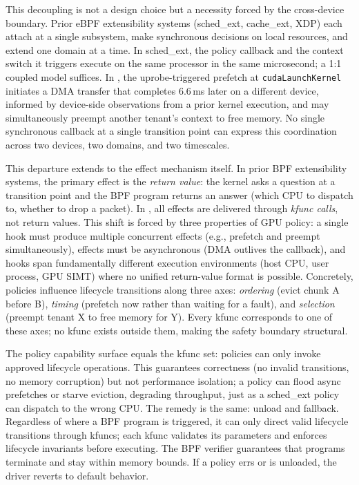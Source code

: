 This decoupling is not a design choice but a necessity forced by the cross-device boundary. Prior eBPF extensibility systems (sched\_ext, cache\_ext, XDP) each attach at a single subsystem, make synchronous decisions on local resources, and extend one domain at a time. In sched\_ext, the policy callback and the context switch it triggers execute on the same processor in the same microsecond; a 1:1 coupled model suffices. In \sys{}, the uprobe-triggered prefetch at \texttt{cudaLaunchKernel} initiates a DMA transfer that completes 6.6\,ms later on a different device, informed by device-side observations from a prior kernel execution, and may simultaneously preempt another tenant's context to free memory. No single synchronous callback at a single transition point can express this coordination across two devices, two domains, and two timescales.

This departure extends to the effect mechanism itself. In prior BPF extensibility systems, the primary effect is the \emph{return value}: the kernel asks a question at a transition point and the BPF program returns an answer (which CPU to dispatch to, whether to drop a packet). In \sys{}, all effects are delivered through \emph{kfunc calls}, not return values. This shift is forced by three properties of GPU policy: a single hook must produce multiple concurrent effects (e.g., prefetch and preempt simultaneously), effects must be asynchronous (DMA outlives the callback), and hooks span fundamentally different execution environments (host CPU, user process, GPU SIMT) where no unified return-value format is possible. Concretely, policies influence lifecycle transitions along three axes: \emph{ordering} (evict chunk A before B), \emph{timing} (prefetch now rather than waiting for a fault), and \emph{selection} (preempt tenant X to free memory for Y). Every kfunc corresponds to one of these axes; no kfunc exists outside them, making the safety boundary structural.

The policy capability surface equals the kfunc set: policies can only invoke approved lifecycle operations. This guarantees correctness (no invalid transitions, no memory corruption) but not performance isolation; a policy can flood async prefetches or starve eviction, degrading throughput, just as a sched\_ext policy can dispatch to the wrong CPU. The remedy is the same: unload and fallback. Regardless of where a BPF program is triggered, it can only direct valid lifecycle transitions through kfuncs; each kfunc validates its parameters and enforces lifecycle invariants before executing. The BPF verifier guarantees that programs terminate and stay within memory bounds. If a policy errs or is unloaded, the driver reverts to default behavior.

